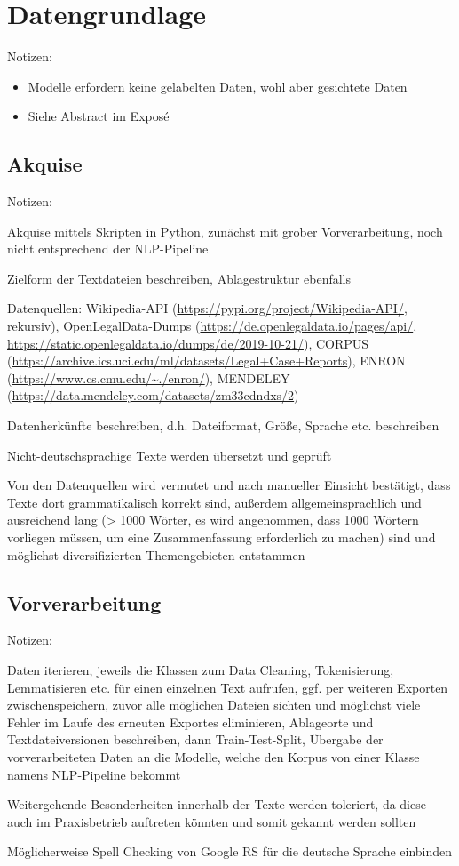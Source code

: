 \chapter{Datengrundlage}
\thispagestyle{fancy}
\label{chap:Datengrundlage}

Notizen:
\begin{itemize}
	\item Modelle erfordern keine gelabelten Daten, wohl aber gesichtete Daten	
	\item Siehe Abstract im Exposé
\end{itemize}


\section{Akquise}
Notizen:
	\item Akquise mittels Skripten in Python, zunächst mit grober Vorverarbeitung, noch nicht entsprechend der NLP-Pipeline
	\item Zielform der Textdateien beschreiben, Ablagestruktur ebenfalls
	\item Datenquellen: Wikipedia-API (\url{https://pypi.org/project/Wikipedia-API/}, rekursiv), OpenLegalData-Dumps (\url{https://de.openlegaldata.io/pages/api/}, \url{https://static.openlegaldata.io/dumps/de/2019-10-21/}), CORPUS (\url{https://archive.ics.uci.edu/ml/datasets/Legal+Case+Reports}), ENRON (\url{https://www.cs.cmu.edu/~./enron/}), MENDELEY (\url{https://data.mendeley.com/datasets/zm33cdndxs/2})
	\item Datenherkünfte beschreiben, d.h. Dateiformat, Größe, Sprache etc. beschreiben
	\item Nicht-deutschsprachige Texte werden übersetzt und geprüft
	\item Von den Datenquellen wird vermutet und nach manueller Einsicht bestätigt, dass Texte dort grammatikalisch korrekt sind, außerdem allgemeinsprachlich und ausreichend lang (> 1000 Wörter, es wird angenommen, dass 1000 Wörtern vorliegen müssen, um eine Zusammenfassung erforderlich zu machen) sind und möglichst diversifizierten Themengebieten entstammen


\section{Vorverarbeitung}
Notizen:
	\item Daten iterieren, jeweils die Klassen zum Data Cleaning, Tokenisierung, Lemmatisieren etc. für einen einzelnen Text aufrufen, ggf. per weiteren Exporten zwischenspeichern, zuvor alle möglichen Dateien sichten und möglichst viele Fehler im Laufe des erneuten Exportes eliminieren, Ablageorte und Textdateiversionen beschreiben, dann Train-Test-Split, Übergabe der vorverarbeiteten Daten an die Modelle, welche den Korpus von einer Klasse namens NLP-Pipeline bekommt
	\item Weitergehende Besonderheiten innerhalb der Texte werden toleriert, da diese auch im Praxisbetrieb auftreten könnten und somit gekannt werden sollten
	\item Möglicherweise Spell Checking von Google RS für die deutsche Sprache einbinden


